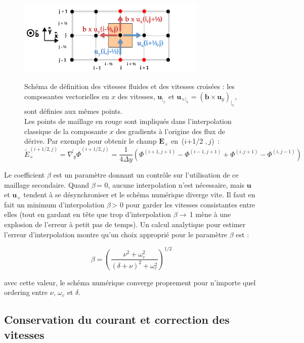 \begin{refsection}
\begin{figure}[!htbp]
\centering
\includegraphics[width=0.8\textwidth]{figures/3-magnisVectCross.png}
{\captionsetup{justification=raggedright,
singlelinecheck=false}\label{3-magnisVectCross}\caption{Schéma de définition
des vitesses fluides et des vitesses croisées : les composantes vectorielles en
$x$ des vitesses, $\mathbf u_{|_x}$ et $\mathbf u_{\times|_x}=(\mathbf
b\times\mathbf u_y)_{|_x}$, sont définies aux mêmes points. \\ Les points de
maillage en rouge sont impliqués dans l'interpolation classique de la composante $x$ des gradients à l'origine des flux de dérive.
 Par exemple pour obtenir le champ $\mathbf{E}_\times$ en~($i$+1/2 ,$\,j$)~:
 $$\widetilde{E}_{\times}^{(i+1/2,j)}={\widetilde{\nabla_y
 \Phi}}^{(i+1/2,j)}=\frac{1}{4\Delta
 y}(\Phi^{(i+1,j+1)}-\Phi^{(i-1,j+1)}+\Phi^{(i,j+1)}-\Phi^{(i,j-1)})$$ }}
\end{figure}

Le coefficient $\beta$ est un paramètre donnant un contrôle sur
l'utilisation de ce maillage secondaire. Quand $\beta\,$= 0, aucune
interpolation n'est nécessaire, mais $\mathbf{u}$ et $\mathbf{u}_\times$
tendent à se désynchroniser et le schéma numérique diverge vite. Il faut en
fait un minimum d'interpolation $\beta\,$> 0 pour garder les vitesses
consistantes entre elles (tout en gardant en tête que trop d'interpolation
$\beta\rightarrow\,$1 mène à une explosion de l'erreur à petit pas de temps). Un
calcul analytique pour estimer l'erreur d'interpolation montre qu'un choix approprié pour le paramètre $\beta$
est :

\begin{equation}
\label{3-eqMvtPonderee3}
\beta=\left(\frac{\nu^2+\omega_c^2}{(\delta+\nu)^2+\omega_c^2}\right)^{1/2}
\end{equation}

avec cette valeur, le schéma numérique converge proprement pour n'importe quel
ordering entre $\nu$, $\omega_c$ et $\delta$.


\subsection{Conservation du courant et correction des vitesses}

\end{refsection}
